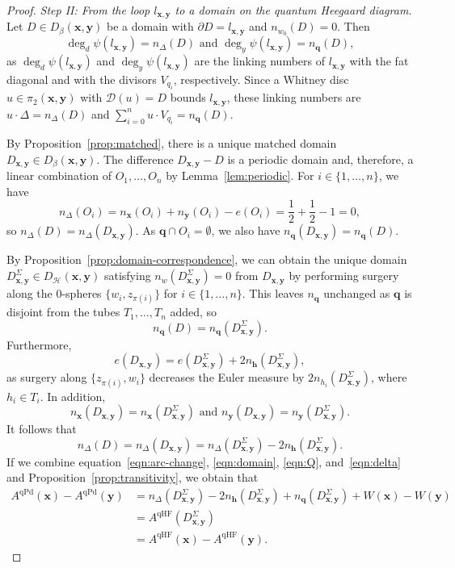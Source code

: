 \documentclass[11pt]{amsart}
\numberwithin{equation}{section}
\numberwithin{figure}{section}
\theoremstyle{definition}
\newcommand{\cD}{\mathcal{D}}
\newcommand{\cH}{\mathcal{H}}
\DeclareMathOperator{\qHF}{qHF}
\DeclareMathOperator{\qPd}{qPd}
\newcommand{\hs}{\boldsymbol{h}}
\newcommand{\qs}{\boldsymbol{q}}
\newcommand{\xs}{\boldsymbol{x}}
\newcommand{\ys}{\boldsymbol{y}}
\begin{document}
\begin{proof}
{\it Step II: From the loop $l_{\xs,\ys}$ to a domain on the quantum Heegaard diagram.} Let $D \in D_{\beta}(\xs,\ys)$ be a domain with $\partial D = l_{\xs,\ys}$ and $n_{w_0}(D) = 0$. Then
\begin{equation}\label{eqn:domain}
\deg_d \psi(l_{\xs,\ys}) = n_\Delta(D) \text{ and }
\deg_y \psi(l_{\xs,\ys}) = n_{\qs}(D),
\end{equation}
as $\deg_d \psi(l_{\xs,\ys})$ and $\deg_y \psi(l_{\xs,\ys})$ are the linking numbers of $l_{\xs,\ys}$ with the fat diagonal and with the divisors $V_{q_i}$, respectively. Since a Whitney disc $u \in \pi_2(\xs,\ys)$ with $\cD(u) = D$ bounds $l_{\xs,\ys}$, these linking numbers are $u \cdot \Delta = n_\Delta(D)$ and $\sum_{i=0}^n u \cdot V_{q_i} = n_{\qs}(D)$.

By Proposition~\ref{prop:matched}, there is a unique matched domain $D_{\xs,\ys} \in D_{\beta}(\xs,\ys)$. The difference $D_{\xs,\ys} - D$ is a periodic domain and, therefore, a linear combination of $O_1,\dots,O_n$ by Lemma~\ref{lem:periodic}. For $i \in \{1,\dots,n\}$, we have
\[
n_\Delta(O_i) = n_{\xs}(O_i) + n_{\ys}(O_i) - e(O_i) = \frac{1}{2} + \frac{1}{2} - 1 = 0,
\]
so $n_\Delta(D) = n_\Delta(D_{\xs,\ys})$. As $\qs \cap O_i = \emptyset$, we also have 
$n_{\qs}(D_{\xs,\ys}) = n_{\qs}(D)$.

By Proposition~\ref{prop:domain-correspondence}, we can obtain the unique domain $D^\Sigma_{\xs,\ys} \in D_{\cH}(\xs,\ys)$ satisfying $n_w(D^\Sigma_{\xs,\ys})=0$ from $D_{\xs,\ys}$ by performing surgery along the 0-spheres $\{w_i,z_{\pi(i)}\}$ for $i \in \{1,\dots,n\}$. This leaves $n_{\qs}$ unchanged as $\qs$ is disjoint from the tubes $T_1,\dots,T_n$ added, so
\begin{equation}\label{eqn:Q}
    n_{\qs}(D) = n_{\qs}(D^\Sigma_{\xs,\ys}).
\end{equation}
Furthermore,
\[
e(D_{\xs,\ys}) = e\left(D^\Sigma_{\xs,\ys}\right) + 2n_{\hs}\left(D^\Sigma_{\xs,\ys}\right),
\]
as surgery along $\{z_{\pi(i)}, w_i\}$ decreases the Euler measure by $2n_{h_i}(D^\Sigma_{\xs,\ys})$, where $h_i \in T_i$. In addition,
\[
n_{\xs}(D_{\xs,\ys}) = n_{\xs}\left(D^\Sigma_{\xs,\ys}\right) \text{ and } n_{\ys}(D_{\xs,\ys}) = n_{\ys}\left(D^\Sigma_{\xs,\ys}\right).
\]
It follows that
\begin{equation}\label{eqn:delta}
n_\Delta(D) = n_\Delta(D_{\xs,\ys}) = n_\Delta\left(D^\Sigma_{\xs,\ys}\right) - 2n_{\hs}\left(D^\Sigma_{\xs,\ys}\right).
\end{equation}
If we combine equation~\eqref{eqn:arc-change}, \eqref{eqn:domain}, \eqref{eqn:Q}, and~\eqref{eqn:delta} and Proposition~\ref{prop:transitivity}, we obtain that
\[
\begin{split}
A^{\qPd}(\xs)-A^{\qPd}(\ys) &= n_\Delta\left(D^\Sigma_{\xs,\ys}\right) - 2n_{\hs}\left(D^\Sigma_{\xs,\ys}\right) + n_{\qs}(D^\Sigma_{\xs,\ys}) + W(\xs) - W(\ys) \\ 
&= A^{\qHF}(D^\Sigma_{\xs,\ys}) \\ 
&= A^{\qHF}(\xs) - A^{\qHF}(\ys).
\end{split}
\]


\end{proof}
\end{document}
